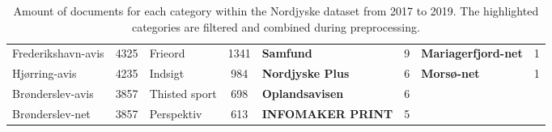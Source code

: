 \begin{table*}[h]
\begin{tabular}{l|c|l|c|l|c|l|c}
		Frederikshavn-avis  &  4325  & Frieord         &  1341  & \textbf{Samfund}               &   9    & \textbf{Mariagerfjord-net}     &   1    \\
		Hjørring-avis       &  4235  & Indsigt         &  984   & \textbf{Nordjyske Plus}        &   6    & \textbf{Morsø-net}             &   1    \\
		Brønderslev-avis    &  3857  & Thisted sport   &  698   & \textbf{Oplandsavisen}         &   6    &                                &        \\
		Brønderslev-net     &  3857  & Perspektiv      &  613   & \textbf{INFOMAKER PRINT}       &   5    &                                &        \\
		\bottomrule
	\end{tabular}
	\caption{Amount of documents for each category within the Nordjyske dataset from 2017 to 2019.
		The highlighted categories are filtered and combined during preprocessing.}
	\label{tab:category_table}
\end{table*}